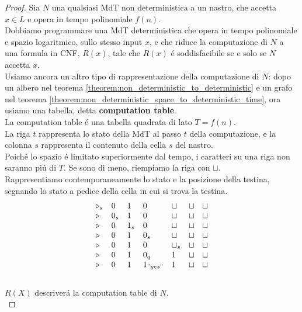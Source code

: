 \begin{proof}
Sia $N$ una qualsiasi MdT non deterministica a un nastro, che accetta $x \in L$ e opera in tempo polinomiale $f(n)$.\\
Dobbiamo programmare una MdT deterministica che opera in tempo polinomiale e spazio logaritmico,
sullo stesso input $x$, e che riduce la computazione di $N$ a una formula in CNF, $R(x)$,
tale che $R(x)$ é soddisfacibile se e solo se $N$ accetta $x$.\\

Usiamo ancora un altro tipo di rappresentazione della computazione di $N$: 
dopo un albero nel teorema \ref{theorem:non_deterministic_to_deterministic} 
e un grafo nel teorema \ref{theorem:non_deterministic_space_to_deterministic_time},
ora usiamo una tabella, detta \textbf{computation table}.\\

La computation table é una tabella quadrata di lato $T = f(n)$.\\

La riga $t$ rappresenta lo stato della MdT al passo $t$ della computazione,
e la colonna $s$ rappresenta il contenuto della cella $s$ del nastro.\\

Poiché lo spazio é limitato superiormente dal tempo, i caratteri su una riga non
saranno piú di $T$. Se sono di meno, riempiamo la riga con ${\sqcup}$. \\

Rappresentiamo contemporaneamente lo stato e la posizione della testina,
segnando lo stato a pedice della cella in cui si trova la testina.\\

\[
\begin{array}{lllllll}
{\triangleright}_s  & 0    & 1          & 0          & {\sqcup}    & {\sqcup} & {\sqcup} \\
{\triangleright}    & 0_s  & 1          & 0          & {\sqcup}    & {\sqcup} & {\sqcup} \\
{\triangleright}    & 0    & 1_s        & 0          & {\sqcup}    & {\sqcup} & {\sqcup} \\
{\triangleright}    & 0    & 1          & 0_s        & {\sqcup}    & {\sqcup} & {\sqcup} \\
{\triangleright}    & 0    & 1          & 0          & {\sqcup}_s  & {\sqcup} & {\sqcup} \\
{\triangleright}    & 0    & 1          & 0_q        & 1           & {\sqcup} & {\sqcup} \\
{\triangleright}    & 0    & 1          & 1_{"yes"}  & 1           & {\sqcup} & {\sqcup}
\end{array}
\]
\text{ }\\
$R(X)$ descriverá la computation table di $N$.\\


\end{proof}
